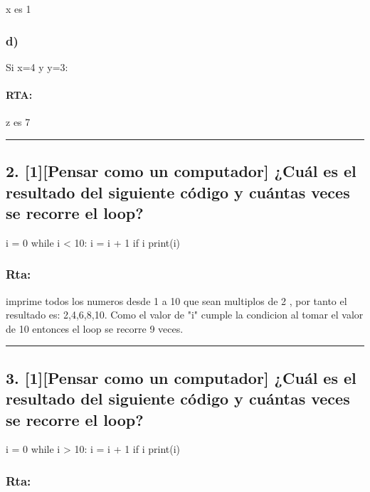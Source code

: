 \documentclass[11pt]{article}
\begin{document}
x es 1

\subsubsection{d)}\label{d}

Si x=4 y y=3:

\paragraph{RTA:}\label{rta-3}

z es 7

    \begin{center}\rule{0.5\linewidth}{\linethickness}\end{center}

    \subsection{2. {[}1{]}{[}Pensar como un computador{]} ¿Cuál es el
resultado del siguiente código y cuántas veces se recorre el
loop?}\label{pensar-como-un-computador-cuuxe1l-es-el-resultado-del-siguiente-cuxf3digo-y-cuuxe1ntas-veces-se-recorre-el-loop}
i = 0
while i < 10:
    i = i + 1
    if i %
        print(i)
    \subsubsection{Rta:}\label{rta}

imprime todos los numeros desde 1 a 10 que sean multiplos de 2 , por
tanto el resultado es: 2,4,6,8,10. Como el valor de "i" cumple la
condicion al tomar el valor de 10 entonces el loop se recorre 9 veces.

    \begin{center}\rule{0.5\linewidth}{\linethickness}\end{center}

    \subsection{3. {[}1{]}{[}Pensar como un computador{]} ¿Cuál es el
resultado del siguiente código y cuántas veces se recorre el
loop?}\label{pensar-como-un-computador-cuuxe1l-es-el-resultado-del-siguiente-cuxf3digo-y-cuuxe1ntas-veces-se-recorre-el-loop}
i = 0
while i > 10:
    i = i + 1
    if i %
        print(i)
    \subsubsection{Rta:}\label{rta}
\end{document}
